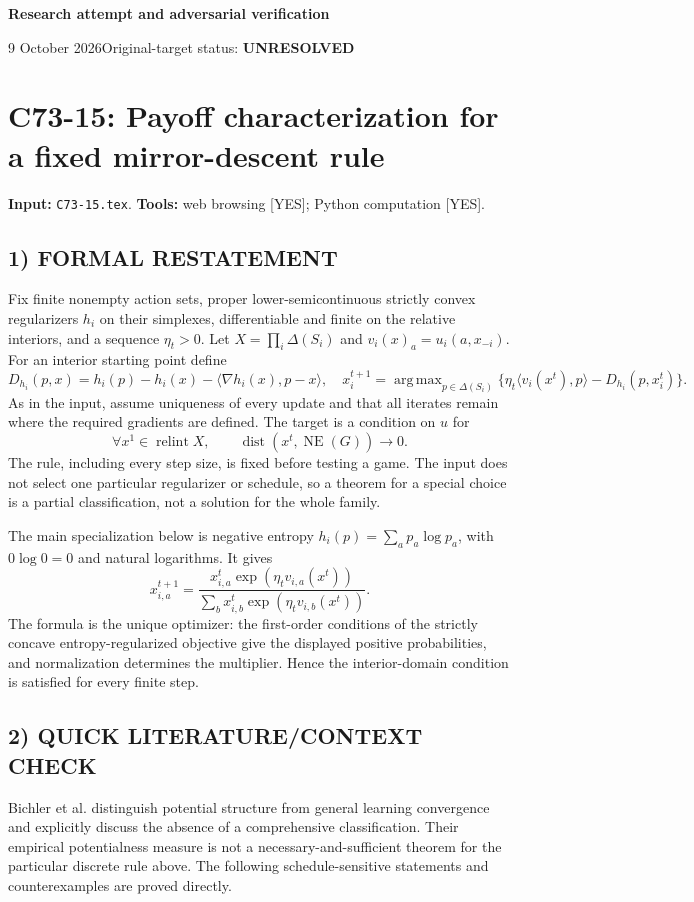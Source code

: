 \documentclass[11pt,a4paper]{article}
\newcommand{\NE}{\operatorname{NE}}
\DeclareMathOperator*{\argmax}{arg\,max}
\theoremstyle{definition}
\theoremstyle{remark}
\begin{document}
{\large\bfseries Research attempt and adversarial verification}\par
9 October 2026\hfill Original-target status: \textbf{UNRESOLVED}\par
\section{C73-15: Payoff characterization for a fixed mirror-descent rule}
\label{sec:C73-15}
\noindent\textbf{Input:} \texttt{C73-15.tex}. \quad\textbf{Tools:} web browsing [YES]; Python computation [YES].

\subsection*{1) FORMAL RESTATEMENT}
Fix finite nonempty action sets, proper lower-semicontinuous strictly convex
regularizers $h_i$ on their simplexes, differentiable and finite on the relative
interiors, and a sequence $\eta_t>0$. Let $X=\prod_i\Delta(S_i)$ and
$v_i(x)_a=u_i(a,x_{-i})$. For an interior starting point define
\[
 D_{h_i}(p,x)=h_i(p)-h_i(x)-\langle\nabla h_i(x),p-x\rangle,
\quad
 x_i^{t+1}=\argmax_{p\in\Delta(S_i)}
 \{\eta_t\langle v_i(x^t),p\rangle-D_{h_i}(p,x_i^t)\}.
\]
As in the input, assume uniqueness of every update and that all iterates remain
where the required gradients are defined. The target is a condition on $u$ for
\[
 \forall x^1\in\operatorname{relint}X,\qquad
 \operatorname{dist}(x^t,\NE(G))\longrightarrow0.
\]
The rule, including every step size, is fixed before testing a game. The input
does not select one particular regularizer or schedule, so a theorem for a
special choice is a partial classification, not a solution for the whole family.

The main specialization below is negative entropy
$h_i(p)=\sum_a p_a\log p_a$, with $0\log0=0$ and natural logarithms. It gives
\[
 x_{i,a}^{t+1}=
 \frac{x_{i,a}^{t}\exp(\eta_t v_{i,a}(x^t))}
      {\sum_bx_{i,b}^{t}\exp(\eta_t v_{i,b}(x^t))}.
 \tag{MD}
\]
The formula is the unique optimizer: the first-order conditions of the strictly
concave entropy-regularized objective give the displayed positive probabilities,
and normalization determines the multiplier. Hence the interior-domain condition
is satisfied for every finite step.

\subsection*{2) QUICK LITERATURE/CONTEXT CHECK}
Bichler et al. \cite{potentialness} distinguish potential structure from general
learning convergence and explicitly discuss the absence of a comprehensive
classification. Their empirical potentialness measure is not a necessary-and-sufficient
theorem for the particular discrete rule above. The following schedule-sensitive
statements and counterexamples are proved directly.
\end{document}
